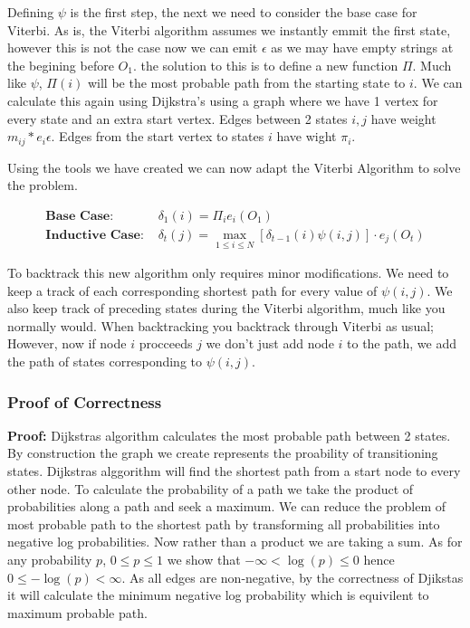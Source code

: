 Defining $\psi$ is the first step, the next we need to consider the base case for Viterbi. As is, the Viterbi algorithm assumes we instantly emmit the first state, however this is not the case now we can emit $\epsilon$ as we may have empty strings at the begining before $O_1$. the solution to this is to define a new function $\Pi$. Much like $\psi$, $\Pi(i)$ will be the most probable path from the starting state to $i$. We can calculate this again using Dijkstra's using a graph where we have 1 vertex for every state and an extra start vertex. Edges between 2 states $i,j$ have weight $m_{ij}*e_i{\epsilon}$. Edges from the start vertex to states $i$ have wight $\pi_i$.

Using the tools we have created we can now adapt the Viterbi Algorithm to solve the problem.


\begin{align*}
    \textbf{Base Case: } &\delta_1(i) = \Pi_i e_i(O_1)\\
    \textbf{Inductive Case: } &\delta_t(j) = \max_{1\leq i \leq N}[\delta_{t-1}(i)\psi(i,j)]\cdot e_j(O_t)
\end{align*}

To backtrack this new algorithm only requires minor modifications. We need to keep a track of each corresponding shortest path for every value of $\psi(i,j)$. We also keep track of preceding states during the Viterbi algorithm, much like you normally would. When backtracking you backtrack through Viterbi as usual; However, now if node $i$ procceeds $j$ we don't just add node $i$ to the path, we add the path of states corresponding to $\psi(i,j)$.

\subsubsection*{Proof of Correctness}
\textbf{Proof:} Dijkstras algorithm calculates the most probable path between 2 states. By construction the graph we create represents the proability of transitioning states. Dijkstras alggorithm will find the shortest path from a start node to every other node. To calculate the probability of a path we take the product of probabilities along a path and seek a maximum. We can reduce the problem of most probable path to the shortest path by transforming all probabilities into negative log probabilities. Now rather than a product we are taking a sum. As for any probability $p$, $0 \leq p \leq 1$ we show that $-\infty < \log(p) \leq 0$ hence $0 \leq -\log(p) < \infty$. As all edges are non-negative, by the correctness of Djikstas it will calculate the minimum negative log probability which is equivilent to maximum probable path.

